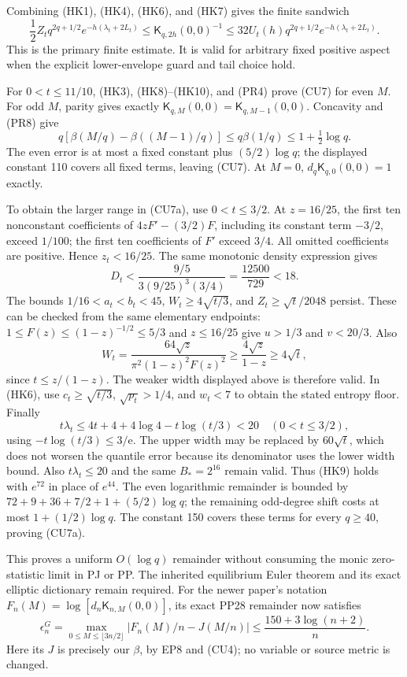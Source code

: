 \documentclass[10pt]{article}
\begin{document}
Combining (HK1), (HK4), (HK6), and (HK7) gives the finite sandwich \[
 \boxed{\frac12 Z_tq^{2q+1/2}e^{-h(\lambda_t+2L_t)}
 \le\mathsf K_{q,2h}(0,0)^{-1}
 \le32U_t(h)q^{2q+1/2}e^{-h(\lambda_t+2L_t)}.}
 \tag{HK10}
\] This is the primary finite estimate. It is valid for arbitrary fixed positive aspect when the explicit lower-envelope guard and tail choice hold.

For \(0<t\le11/10\), (HK3), (HK8)--(HK10), and (PR4) prove (CU7) for even \(M\). For odd \(M\), parity gives exactly \(\mathsf K_{q,M}(0,0)=\mathsf K_{q,M-1}(0,0)\). Concavity and (PR8) give \[
 q[\beta(M/q)-\beta((M-1)/q)]
 \le q\beta(1/q)\le1+\tfrac12\log q.
\] The even error is at most a fixed constant plus \((5/2)\log q\); the displayed constant 110 covers all fixed terms, leaving (CU7). At \(M=0\), \(d_q\mathsf K_{q,0}(0,0)=1\) exactly.

To obtain the larger range in (CU7a), use \(0<t\le3/2\). At \(z=16/25\), the first ten nonconstant coefficients of \(4zF'-(3/2)F\), including its constant term \(-3/2\), exceed \(1/100\); the first ten coefficients of \(F'\) exceed \(3/4\). All omitted coefficients are positive. Hence \(z_t<16/25\). The same monotonic density expression gives \[
 D_t<\frac{9/5}{3(9/25)^3(3/4)}
 =\frac{12500}{729}<18.
\] The bounds \(1/16<a_t<b_t<45\), \(W_t\ge4\sqrt{t/3}\), and \(Z_t\ge\sqrt t/2048\) persist. These can be checked from the same elementary endpoints: \(1\le F(z)\le(1-z)^{-1/2}\le5/3\) and \(z\le16/25\) give \(u>1/3\) and \(v<20/3\). Also \[
 W_t=\frac{64\sqrt z}{\pi^2(1-z)^2F(z)^2}
 \ge\frac{4\sqrt z}{1-z}\ge4\sqrt t,
\] since \(t\le z/(1-z)\). The weaker width displayed above is therefore valid. In (HK6), use \(c_t\ge\sqrt{t/3}\), \(\sqrt{p_t}>1/4\), and \(w_t<7\) to obtain the stated entropy floor. Finally \[
 t\lambda_t\le4t+4+4\log4-t\log(t/3)<20
 \quad(0<t\le3/2),
\] using \(-t\log(t/3)\le3/\mathrm e\). The upper width may be replaced by \(60\sqrt t\), which does not worsen the quantile error because its denominator uses the lower width bound. Also \(t\lambda_t\le20\) and the same \(B_*=2^{16}\) remain valid. Thus (HK9) holds with \(e^{72}\) in place of \(e^{44}\). The even logarithmic remainder is bounded by \(72+9+36+7/2+1+(5/2)\log q\); the remaining odd-degree shift costs at most \(1+(1/2)\log q\). The constant 150 covers these terms for every \(q\ge40\), proving (CU7a).

This proves a uniform \(O(\log q)\) remainder without consuming the monic zero-statistic limit in PJ or PP. The inherited equilibrium Euler theorem and its exact elliptic dictionary remain required. For the newer paper's notation \(F_n(M)=\log[d_n\mathsf K_{n,M}(0,0)]\), its exact PP28 remainder now satisfies \[
 \boxed{\epsilon_n^G
 =\max_{0\le M\le\lfloor3n/2\rfloor}
 |F_n(M)/n-J(M/n)|
 \le\frac{150+3\log(n+2)}{n}.}
 \tag{HK11}
\] Here its \(J\) is precisely our \(\beta\), by EP8 and (CU4); no variable or source metric is changed.
\end{document}
